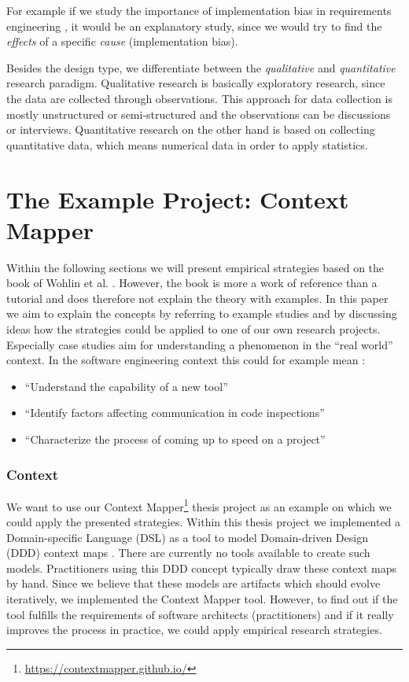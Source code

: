 \documentclass[runningheads]{llncs}
\begin{document}
For example if we study the importance of implementation bias in requirements engineering \cite{Perry:2006:CSS:1134285.1134497}, it would be an explanatory study, since we would try to find the \textit{effects} of a specific \textit{cause} (implementation bias).

Besides the design type, we differentiate between the \textit{qualitative} and \textit{quantitative} research paradigm. Qualitative research is basically exploratory research, since the data are collected through observations. This approach for data collection is mostly unstructured or semi-structured and the observations can be discussions or interviews. Quantitative research on the other hand is based on collecting quantitative data, which means numerical data in order to apply statistics.

\section{The Example Project: Context Mapper}\label{the-example}
Within the following sections we will present empirical strategies based on the book of Wohlin et al. \cite{Wohlin:2012:ESE:2349018}. However, the book is more a work of reference than a tutorial and does therefore not explain the theory with examples. In this paper we aim to explain the concepts by referring to example studies and by discussing ideas how the strategies could be applied to one of our own research projects. Especially case studies aim for understanding a phenomenon in the ``real world'' context. In the software engineering context this could for example mean \cite{Perry:2006:CSS:1134285.1134497}:

\begin{itemize}
	\item ``Understand the capability of a new tool''
	\item ``Identify factors affecting communication in code inspections''
	\item ``Characterize the process of coming up to speed on a project''
\end{itemize}

\subsubsection{Context}
We want to use our Context Mapper\footnote{\url{https://contextmapper.github.io/}} thesis project \cite{context-mapper-dsl} as an example on which we could apply the presented strategies. Within this thesis project we implemented a Domain-specific Language (DSL) as a tool to model Domain-driven Design (DDD) context maps \cite{EvansEric2012Dd:t}. There are currently no tools available to create such models. Practitioners using this DDD concept typically draw these context maps by hand. Since we believe that these models are artifacts which should evolve iteratively, we implemented the Context Mapper tool. However, to find out if the tool fulfills the requirements of software architects (practitioners) and if it really improves the process in practice, we could apply empirical research strategies.
\end{document}
